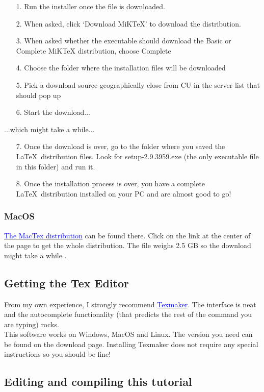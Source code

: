 \documentclass{report}
\begin{document}
\begin{itemize}
\item[1.] Run the installer once the file is downloaded.
\item[2.] When asked, click ‘Download MiKTeX’ to download the distribution.
\item[3.] When asked whether the executable should download the Basic or Complete MiKTeX distribution, choose Complete
\item[4.] Choose the folder where the installation files will be downloaded
\item[5.] Pick a download source geographically close from CU in the server list that should pop up
\item[6.] Start the download...
\end{itemize}
...which might take a while...
\begin{itemize}
\item[7.] Once the download is over, go to the folder where you saved the \LaTeX\ distribution files. Look for setup-2.9.3959.exe (the only executable file in this folder) and run it.
\item[8.] Once the installation process is over, you have a complete \LaTeX\ distribution installed on your PC and are almost good to go!
\end{itemize}

\subsubsection{MacOS}
\href{https://tug.org/mactex/mactex-download.html}{\textcolor{blue}{The MacTex distribution}} can be found there. Click on the link at the center of the page to get the whole distribution. The file weighs 2.5 GB so the download might take a while .

\subsection{Getting the Tex Editor}
From my own experience, I strongly recommend
\href{http://www.xm1math.net/texmaker/}{\textcolor{blue}{Texmaker}}. The interface is neat and the autocomplete functionality (that predicts the rest of the command you are typing) rocks.\\
This software works on Windows, MacOS and Linux. The version you need can be found on the download page. Installing Texmaker does not require any special instructions so you should be fine!

\subsection{Editing and compiling this tutorial}
\end{document}
